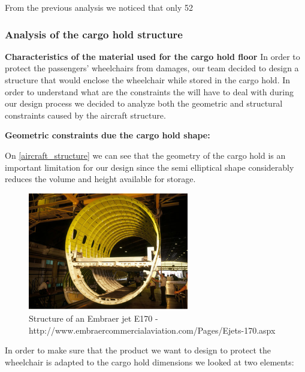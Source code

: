 From the previous analysis we noticed that only 52%

\subsubsection*{Analysis of the cargo hold structure}

\textbf{Characteristics of the material used for the cargo hold floor}
In order to protect the passengers’ wheelchairs from damages, our team decided to design a structure that would enclose the wheelchair while stored in the cargo hold. In order to understand what are the constraints the will have to deal with during our design process we decided to analyze both the geometric and structural constraints caused by the aircraft structure.

\textbf{Geometric constraints due the cargo hold shape:}

On \ref{aircraft_structure} we can see that the geometry of the cargo hold is an important limitation for our design since the semi elliptical shape considerably reduces the volume and height available for storage.

\begin{figure}[h]
\centering
\includegraphics[width=7cm]{images/aircraft_structure}
\caption{Structure of an Embraer jet E170 - http://www.embraercommercialaviation.com/Pages/Ejets-170.aspx}
\label{fig:aircraft_structure}
\end{figure}

In order to make sure that the product we want to design to protect the wheelchair is adapted to the cargo hold dimensions we looked at two elements:

